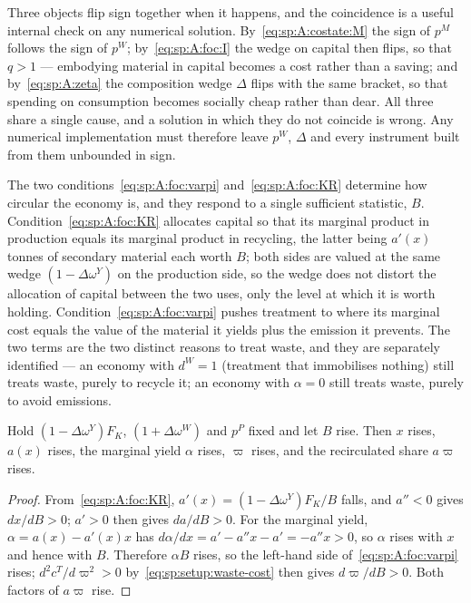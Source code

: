 Three objects flip sign together when it happens, and the coincidence is a useful internal check on
any numerical solution. By~\eqref{eq:sp:A:costate:M} the sign of $p^M$ follows the sign of $p^W$;
by~\eqref{eq:sp:A:foc:I} the wedge on capital then flips, so that $q>1$ --- embodying material in
capital becomes a cost rather than a saving; and by~\eqref{eq:sp:A:zeta} the composition wedge $\Delta$
flips with the same bracket, so that spending on consumption becomes socially cheap rather than dear.
All three share a single cause, and a solution in which they do not coincide is wrong. Any numerical
implementation must therefore leave $p^W$, $\Delta$ and every instrument built from them unbounded in
sign.

 The two conditions~\eqref{eq:sp:A:foc:varpi}
and~\eqref{eq:sp:A:foc:KR} determine how circular the economy is, and they respond to a single
sufficient statistic, $B$. Condition~\eqref{eq:sp:A:foc:KR} allocates capital so that its
marginal product in production equals its marginal product in recycling, the latter being $a'(x)$
tonnes of secondary material each worth $B$; both sides are valued at the same wedge
$\left(1-\Delta\omega^Y\right)$ on the production side, so the wedge does not distort the allocation of
capital between the two uses, only the level at which it is worth holding.
Condition~\eqref{eq:sp:A:foc:varpi} pushes treatment to where its marginal cost equals the value of the
material it yields plus the emission it prevents. The two terms are the two distinct reasons to treat
waste, and they are separately identified --- an economy with $d^W=1$ (treatment that immobilises
nothing) still treats waste, purely to recycle it; an economy with $\alpha=0$ still treats waste,
purely to avoid emissions.

\begin{proposition}\label{prop:sp:A:circularity}
Hold $\left(1-\Delta\omega^Y\right)F_K$, $\left(1+\Delta\omega^W\right)$ and $p^P$ fixed and let
$B$ rise. Then $x$ rises, $a(x)$ rises, the marginal yield $\alpha$ rises, $\varpi$ rises,
and the recirculated share $a\varpi$ rises.
\end{proposition}

\begin{proof}
From~\eqref{eq:sp:A:foc:KR}, $a'(x)=\left(1-\Delta\omega^Y\right)F_K/B$ falls, and $a''<0$
gives $dx/dB>0$; $a'>0$ then gives $da/dB>0$. For the marginal yield,
$\alpha=a(x)-a'(x)x$ has $d\alpha/dx=a'-a''x-a'=-a''x>0$, so $\alpha$ rises with $x$ and hence with
$B$. Therefore $\alpha B$ rises, so the left-hand side
of~\eqref{eq:sp:A:foc:varpi} rises; $d^2c^T/d\varpi^2>0$ by~\eqref{eq:sp:setup:waste-cost} then gives
$d\varpi/dB>0$. Both factors of $a\varpi$ rise.
\end{proof}

